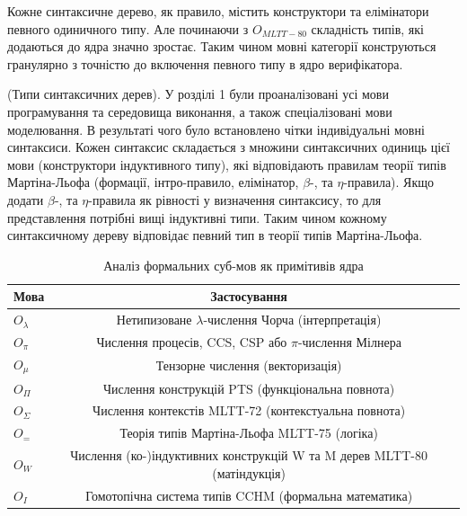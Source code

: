 Кожне синтаксичне дерево, як правило, містить конструктори
та елімінатори певного одиничного типу. Але починаючи з $O_{MLTT-80}$
складність типів, які додаються до ядра значно зростає.
Таким чином мовні категорії конструються гранулярно з
точністю до включення певного типу в ядро верифікатора.

\begin{definition} (Типи синтаксичних дерев).
У розділі 1 були проаналізовані усі мови програмування та середовища виконання,
а також спеціалізовані мови моделювання. В результаті чого було встановлено
чітки індивідуальні мовні синтаксиси. Кожен синтаксис складається з
множини синтаксичних одиниць цієї мови (конструктори індуктивного типу),
які відповідають правилам теорії типів Мартіна-Льофа (формації, інтро-правило,
елімінатор, $\beta$-, та $\eta$-правила). Якщо додати $\beta$-, та $\eta$-правила
як рівності у визначення синтаксису, то для представлення потрібні вищі індуктивні типи.
Таким чином кожному синтаксичному дереву відповідає певний тип в теорії типів Мартіна-Льофа.
\begin{table}
  \caption{Аналіз формальних суб-мов як примітивів ядра}
 \begin{tabular}{lcc}
    \hline
       \textbf{Мова} & \textbf{Застосування} \\
    \hline
    \rowcolor{LightGray}
       $O_\lambda$                     & Нетипизоване $\lambda$-числення Чорча (інтерпретація) \\
    \rowcolor{LightGray}
       $O_\pi$                         & Числення процесів, CCS, CSP або $\pi$-числення Мілнера\\
    \rowcolor{LightGray}
       $O_\mu$                         & Тензорне числення (векторизація) \\
    \hline
    \rowcolor{LightGray}
       $O_\Pi$                         & Числення конструкцій PTS (функціональна повнота) \\
    \rowcolor{LightGray}
       $O_\Sigma$                      & Числення контекстів MLTT-72 (контекстуальна повнота) \\
    \rowcolor{LightGray}
       $O_=$                           & Теорія типів Мартіна-Льофа MLTT-75 (логіка) \\
    \rowcolor{LightGray}
       $O_W$                           & Числення (ко-)індуктивних конструкцій W та M дерев MLTT-80 (матіндукція) \\
    \rowcolor{LightGray}
       $O_{I}$                         & Гомотопічна система типів CCHM (формальна математика) \\

\end{tabular}
\end{table}
\end{definition}
